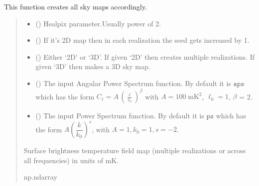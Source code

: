 \documentclass[a4paper,11pt,oneside,english,openany]{sphinxmanual}
\begin{document}
\begin{fulllineitems}
\label{\detokenize{simvis:simvis.allskysim}}
\pysigstartsignatures
{}
\pysigstopsignatures
\sphinxAtStartPar
This function creates all sky maps accordingly.
\begin{quote}\begin{description}
\begin{itemize}
\item {} 
\sphinxAtStartPar
{} () \textendash{} Healpix parameter.Usually power of 2.

\item {} 
\sphinxAtStartPar
{} () \textendash{} If it’s 2D map then in each realization the seed gets increased by 1.

\item {} 
\sphinxAtStartPar
{} () \textendash{} Either ‘2D’ or ‘3D’. If given ‘2D’ then creates multiple realizations. If given ‘3D’ then makes a 3D sky map.

\item {} 
\sphinxAtStartPar
{} () \textendash{} The input Angular Power Spectrum function. By default it is \(\texttt{aps}\) which has the form \(C_{\ell}=A\, \left(\frac{\ell}{\ell_0}\right)^{\beta}\) with \(A = 100\;\text{mK}^2\), \(\ell_0=1\), \(\beta\) = \sphinxhyphen{}2.

\item {} 
\sphinxAtStartPar
{} () \textendash{} The input Power Spectrum function. By default it is \(\texttt{ps}\) which has the form \(A \left(\dfrac{k}{k_0}\right)^{s}\), with \(A=1, k_0=1, s=-2\).

\end{itemize}

\sphinxAtStartPar
Surface brightness temperature field map (multiple realizations or across all frequencies) in units of \(\text{mK}\).

\sphinxAtStartPar
np.ndarray

\end{description}\end{quote}

\end{fulllineitems}
\end{document}
